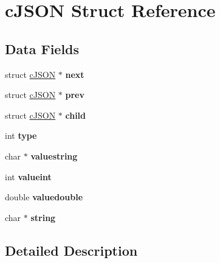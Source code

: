 \hypertarget{structc_j_s_o_n}{}\section{c\+J\+S\+ON Struct Reference}
\label{structc_j_s_o_n}
\subsection*{Data Fields}
\begin{DoxyCompactItemize}
\item 
\mbox{\label{structc_j_s_o_n_ade862b880379b5e2a591f7326401fa8d}} 
struct \hyperlink{structc_j_s_o_n}{c\+J\+S\+ON} $\ast$ {\bfseries next}
\item 
\mbox{\label{structc_j_s_o_n_a488a393f610347821fce8e985e79fc2f}} 
struct \hyperlink{structc_j_s_o_n}{c\+J\+S\+ON} $\ast$ {\bfseries prev}
\item 
\mbox{\label{structc_j_s_o_n_a401b274c2da358dac5c23ab8b2c71f85}} 
struct \hyperlink{structc_j_s_o_n}{c\+J\+S\+ON} $\ast$ {\bfseries child}
\item 
\mbox{\label{structc_j_s_o_n_ab13084c574681593b12f6e0a3db0dcfc}} 
int {\bfseries type}
\item 
\mbox{\label{structc_j_s_o_n_ad43f8de2571e504c4c5ce0a36990e6e1}} 
char $\ast$ {\bfseries valuestring}
\item 
\mbox{\label{structc_j_s_o_n_a369cea49494eb5d4409d532a731a0fbf}} 
int {\bfseries valueint}
\item 
\mbox{\label{structc_j_s_o_n_a4b21817d0fd2919901abadac73214e7f}} 
double {\bfseries valuedouble}
\item 
\mbox{\label{structc_j_s_o_n_aa6b47e9a4b0e0a26f519b1a2b6739983}} 
char $\ast$ {\bfseries string}
\end{DoxyCompactItemize}


\subsection{Detailed Description}



